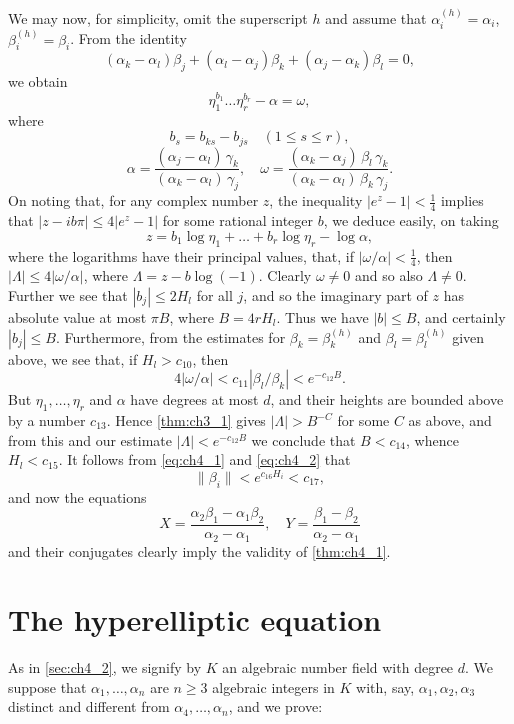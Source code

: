 We may now, for simplicity, omit the superscript $h$ and assume that $\alpha_i^{(h)} = \alpha_i$, $\beta_i^{(h)} = \beta_i$. From the identity
\[
(\alpha_k - \alpha_l) \beta_j + (\alpha_l - \alpha_j) \beta_k + (\alpha_j - \alpha_k) \beta_l = 0,
\]
we obtain
\[
\eta_1^{b_1} \dots \eta_r^{b_r} - \alpha = \omega,
\]
where
\[
b_s = b_{ks} - b_{js} \quad (1 \le s \le r),
\]
\[
\alpha = \frac{(\alpha_j - \alpha_l) \, \gamma_k}{(\alpha_k - \alpha_l) \, \gamma_j}, \quad \omega = \frac{(\alpha_k - \alpha_j) \, \beta_l \, \gamma_k}{(\alpha_k - \alpha_l) \, \beta_k \, \gamma_j}.
\]
On noting that, for any complex number $z$, the inequality $|e^z - 1| < \frac{1}{4}$ implies that $|z - i b \pi| \le 4 |e^z - 1|$ for some rational integer $b$, we deduce easily, on taking
\[
z = b_1 \log \eta_1 + \dots + b_r \log \eta_r - \log \alpha,
\]
where the logarithms have their principal values, that, if $|\omega/\alpha| < \frac{1}{4}$, then $|\Lambda| \le 4 |\omega/\alpha|$, where $\Lambda = z - b \log (-1)$. Clearly $\omega \neq 0$ and so also $\Lambda \neq 0$. Further we see that $|b_j| \le 2H_l$ for all $j$, and so the imaginary part of $z$ has absolute value at most $\pi B$, where $B = 4rH_l$. Thus we have $|b| \le B$, and certainly $|b_j| \le B$. Furthermore, from the estimates for $\beta_k = \beta_k^{(h)}$ and $\beta_l = \beta_l^{(h)}$ given above, we see that, if $H_l > c_{10}$, then
\[
4|\omega/\alpha| < c_{11}|\beta_l/\beta_k| < e^{-c_{12}B}.
\]
But $\eta_1, \dots, \eta_r$ and $\alpha$ have degrees at most $d$, and their heights are bounded above by a number $c_{13}$. Hence \autoref{thm:ch3_1} gives $|\Lambda| > B^{-C}$ for some $C$ as above, and from this and our estimate $|\Lambda| < e^{-c_{12}B}$ we conclude that $B < c_{14}$, whence $H_l < c_{15}$. It follows from \eqref{eq:ch4_1} and \eqref{eq:ch4_2} that
\[
\|\beta_i\| < e^{c_{16}H_i} < c_{17},
\]
and now the equations
\[
X = \frac{\alpha_2 \beta_1 - \alpha_1 \beta_2}{\alpha_2 - \alpha_1}, \quad Y = \frac{\beta_1 - \beta_2}{\alpha_2 - \alpha_1}
\]
and their conjugates clearly imply the validity of \autoref{thm:ch4_1}.

\section{The hyperelliptic equation}\label{sec:ch4_3}

As in \autoref{sec:ch4_2}, we signify by $K$ an algebraic number field with degree $d$. We suppose that $\alpha_1, \dots, \alpha_n$ are $n \ge 3$ algebraic integers in $K$ with, say, $\alpha_1, \alpha_2, \alpha_3$ distinct and different from $\alpha_4, \dots, \alpha_n$, and we prove:

